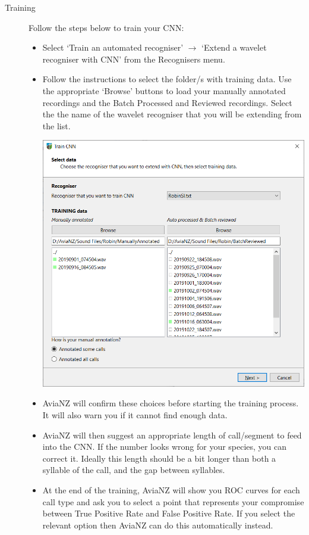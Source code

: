 \documentclass{article}
\begin{document}
\begin{description}
\item[Training] Follow the steps below to train your CNN:
\begin{itemize}
\item Select `Train an automated recogniser' $\rightarrow$ `Extend a wavelet recogniser with CNN' from the Recognisers menu. 
\item Follow the instructions to select the folder/s with training data. Use the appropriate `Browse' buttons to load your manually annotated recordings and the Batch Processed and Reviewed recordings. Select the the name of the wavelet recogniser that you will be extending from the list. 

\begin{center}
    \includegraphics[width=.7\textwidth]{Figures/CNNpage1}
\end{center}

\item AviaNZ will confirm these choices before starting the training process. It will also warn you if it cannot find enough data. 
\item AviaNZ will then suggest an appropriate length of call/segment to feed into the CNN. If the number looks wrong for your species, you can correct it. Ideally this length should be a bit longer than both a syllable of the call, and the gap between syllables. 
\item At the end of the training, AviaNZ will show you ROC curves for each call type and ask you to select a point that represents your compromise between True Positive Rate and False Positive Rate. If you select the relevant option then AviaNZ can do this automatically instead.


\end{itemize}
\end{description}
\end{document}
